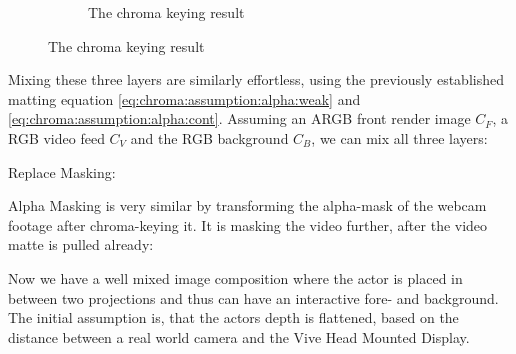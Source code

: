 \begin{figure}[htbp]
\begin{subfigure}[t]{.45\textwidth}
		\caption{The chroma keying result}
	\end{subfigure}
\end{figure}

Mixing these three layers are similarly effortless, using the previously 
established matting equation \eqref{eq:chroma:assumption:alpha:weak} and 
\eqref{eq:chroma:assumption:alpha:cont}. Assuming an ARGB front render image 
$C_F$, a RGB video feed  $C_V$ and the RGB background $C_B$, 
we can mix all three layers:

Replace Masking:







Alpha Masking is very similar by transforming the alpha-mask of the webcam 
footage after chroma-keying it. It is masking the video further, after the 
video matte is pulled already:






Now we have a well mixed image composition where the actor is placed in between 
two projections and thus can have an interactive fore- and background. The 
initial assumption is, that the actors depth is flattened, based on the 
distance between a real world camera and the Vive Head Mounted Display.
